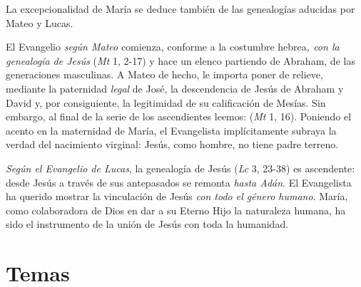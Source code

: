 \begin{body}
	La excepcionalidad de María se deduce también de las genealogías aducidas por Mateo y Lucas.
	
	El Evangelio \emph{según Mateo} comienza, conforme a la costumbre hebrea\emph{, con la genealogía de Jesús} (\emph{Mt} 1, 2-17) y hace un elenco partiendo de Abraham, de las generaciones masculinas. A Mateo de hecho, le importa poner de relieve, mediante la paternidad \emph{legal} de José, la descendencia de Jesús de Abraham y David y, por consiguiente, la legitimidad de su calificación de Mesías. Sin embargo, al final de la serie de los ascendientes leemos:  (\emph{Mt} 1, 16). Poniendo el acento en la maternidad de María, el Evangelista implícitamente subraya la verdad del nacimiento virginal: Jesús, como hombre, no tiene padre terreno.
	
	\emph{Según el Evangelio de Lucas}, la genealogía de Jesús (\emph{Lc} 3, 23-38) es ascendente: desde Jesús a través de sus antepasados se remonta \emph{hasta Adán}. El Evangelista ha querido mostrar la vinculación de Jesús \emph{con todo el género humano}. María, como colaboradora de Dios en dar a su Eterno Hijo la naturaleza humana, ha sido el instrumento de la unión de Jesús con toda la humanidad.
\end{body}

\newsection

\section{Temas}

\temasNavidad